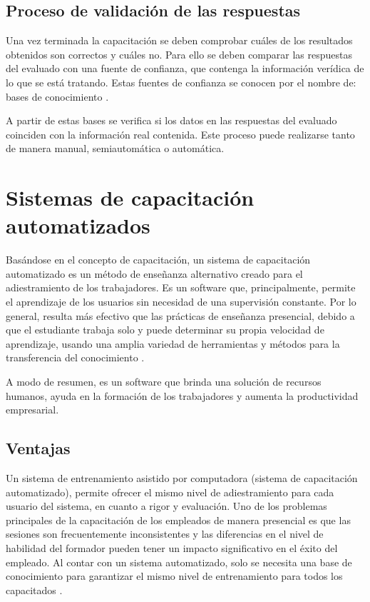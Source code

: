 \subsection{Proceso de validación de las respuestas}
Una vez terminada la capacitación se deben comprobar cuáles de los resultados obtenidos son correctos y cuáles no. Para ello se deben comparar las respuestas del evaluado con una fuente de confianza, que contenga la información verídica de lo que se está tratando. Estas fuentes de confianza se conocen por el nombre de: bases de conocimiento \cite{SEdiagramas}.

A partir de estas bases se verifica si los datos en las respuestas del evaluado coinciden con la información real contenida. Este proceso puede realizarse tanto de manera manual, semiautomática o automática.

\section{Sistemas de capacitación automatizados}
Basándose en el concepto de capacitación, un sistema de capacitación automatizado es un método de enseñanza alternativo creado para el adiestramiento de los trabajadores. Es un software que, principalmente, permite el aprendizaje de los usuarios sin necesidad de una supervisión constante. Por lo general, resulta más efectivo que las prácticas de enseñanza presencial, debido a que el estudiante trabaja solo y puede determinar su propia velocidad de aprendizaje, usando una amplia variedad de herramientas y métodos para la transferencia del conocimiento \cite{CapacitacionAuto}.

A modo de resumen, es un software que brinda una solución de recursos humanos, ayuda en la formación de los trabajadores y aumenta la productividad empresarial.

\subsection{Ventajas}
Un sistema de entrenamiento asistido por computadora (sistema de capacitación automatizado), permite ofrecer el mismo nivel de adiestramiento para cada usuario del sistema, en cuanto a rigor y evaluación. Uno de los problemas principales de la capacitación de los empleados de manera presencial es que las sesiones son frecuentemente inconsistentes y las diferencias en el nivel de habilidad del formador pueden tener un impacto significativo en el éxito del empleado. Al contar con un sistema automatizado, solo se necesita una base de conocimiento para garantizar el mismo nivel de entrenamiento para todos los capacitados \cite{SistemaCapAut}.

